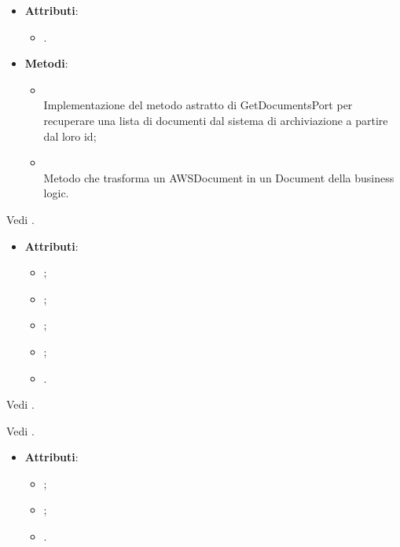 \documentclass[10pt, a4paper]{article}
\begin{document}
\label{GetDocumentsAWSS3Dettaglio}
\begin{itemize}
    \item \textbf{Attributi}:
    \begin{itemize}
        \item {}.
    \end{itemize}
    \item \textbf{Metodi}:
    \begin{itemize}
        \item {}\\
        Implementazione del metodo astratto di GetDocumentsPort per recuperare una lista di documenti dal sistema di archiviazione a partire dal loro id;
        \item {}\\
        Metodo che trasforma un AWSDocument in un Document della business logic.
    \end{itemize}
\end{itemize}

Vedi .

\label{AWSDocumentDettaglio}
\begin{itemize}
    \item \textbf{Attributi}:
    \begin{itemize}
        \item {};
        \item {};
        \item {};
        \item {};
        \item {}.
    \end{itemize}
\end{itemize}

Vedi .

Vedi .

\label{LangchainDocumentDettaglio}
\begin{itemize}
    \item \textbf{Attributi}:
    \begin{itemize}
        \item {};
        \item {};
        \item {}.
    \end{itemize}
\end{itemize}
\end{document}
